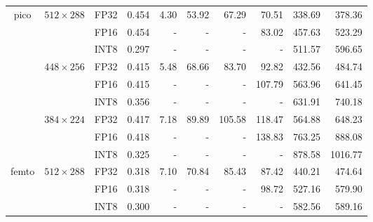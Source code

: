 \begin{appendices}
\begin{table}
\begin{tabular}{|c|c|c|c|rrrrrr|}
        \hline
        \multirow{9}{*}{pico}                                     & \multirow{3}{*}{$512 \times 288$} & FP32 & 0.454 &  4.30 &  53.92 &  67.29 &  70.51 &  338.69 &  378.36 \\
                                                                  &                                   & FP16 & 0.454 &     - &      - &      - &  83.02 &  457.63 &  523.29 \\
                                                                  &                                   & INT8 & 0.297 &     - &      - &      - &      - &  511.57 &  596.65 \\
        \cline{2-10}
                                                                  & \multirow{3}{*}{$448 \times 256$} & FP32 & 0.415 &  5.48 &  68.66 &  83.70 &  92.82 &  432.56 &  484.74 \\
                                                                  &                                   & FP16 & 0.415 &     - &      - &      - & 107.79 &  563.96 &  641.45 \\
                                                                  &                                   & INT8 & 0.356 &     - &      - &      - &      - &  631.91 &  740.18 \\
        \cline{2-10}
                                                                  & \multirow{3}{*}{$384 \times 224$} & FP32 & 0.417 &  7.18 &  89.89 & 105.58 & 118.47 &  564.88 &  648.23 \\
                                                                  &                                   & FP16 & 0.418 &     - &      - &      - & 138.83 &  763.25 &  888.08 \\
                                                                  &                                   & INT8 & 0.325 &     - &      - &      - &      - &  878.58 & 1016.77 \\
        \hline
        \multirow{12}{*}{femto}                                   & \multirow{3}{*}{$512 \times 288$} & FP32 & 0.318 &  7.10 &  70.84 &  85.43 &  87.42 &  440.21 &  474.64 \\
                                                                  &                                   & FP16 & 0.318 &     - &      - &      - &  98.72 &  527.16 &  579.90 \\
                                                                  &                                   & INT8 & 0.300 &     - &      - &      - &      - &  582.56 &  589.16 \\

\end{tabular}
\end{table}
\end{appendices}
